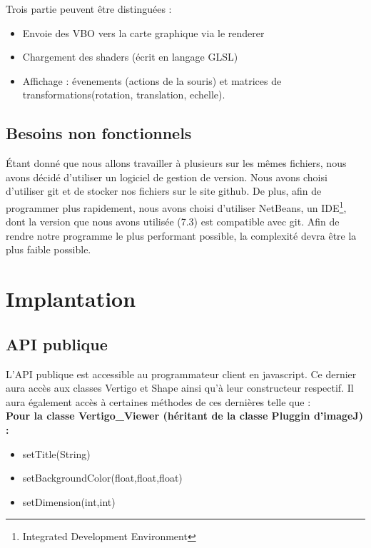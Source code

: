 \documentclass[11pt]{report}
\begin{document}
Trois partie peuvent être distinguées :
\begin{itemize}
\item Envoie des VBO vers la carte graphique via le renderer
\item Chargement des shaders (écrit en langage GLSL)
\item Affichage : évenements (actions de la souris) et matrices de transformations(rotation, translation, echelle).
\end{itemize}


\section{Besoins non fonctionnels}
Étant donné que nous allons travailler à plusieurs sur les mêmes fichiers, nous avons décidé d'utiliser un logiciel de gestion de version. Nous avons choisi d'utiliser git\cite{git} et de stocker nos fichiers sur le site github\cite{github}.
De plus, afin de programmer plus rapidement, nous avons choisi d'utiliser NetBeans\cite{netbeans}, un IDE\footnote{Integrated Development Environment}, dont la version que nous avons utilisée (7.3) est compatible avec git.
Afin de rendre notre programme le plus performant possible, la complexité devra être la plus faible possible. 
\chapter{Implantation} %
\section{API publique} 
L'API publique est accessible au programmateur client en javascript.
Ce dernier aura accès aux classes Vertigo et Shape ainsi qu'à leur constructeur respectif.
Il aura également accès à certaines méthodes de ces dernières telle que : 
\\

\textbf{Pour la classe Vertigo\_Viewer (héritant de la classe Pluggin d'imageJ) :}
\begin{itemize}
\item setTitle(String)
\item setBackgroundColor(float,float,float)
\item setDimension(int,int)
\end{itemize}
\end{document}
